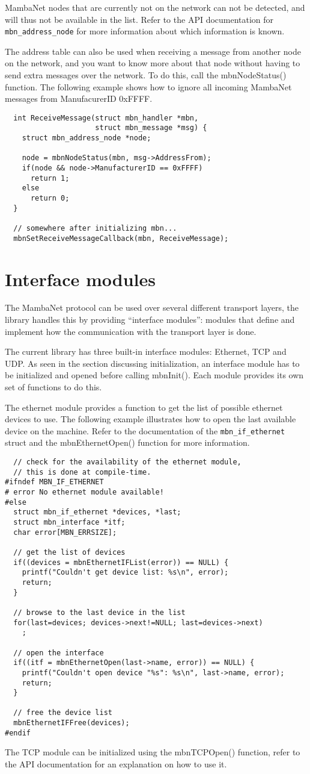 MambaNet nodes that are currently not on the network can not be detected, and will thus not be available in the list. Refer to the API documentation for \verb|mbn_address_node| for more information about which information is known.

The address table can also be used when receiving a message from another node on the network, and you want to know more about that node without having to send extra messages over the network. To do this, call the mbnNodeStatus() function. The following example shows how to ignore all incoming MambaNet messages from ManufacurerID 0xFFFF.
\begin{verbatim}
  int ReceiveMessage(struct mbn_handler *mbn,
                     struct mbn_message *msg) {
    struct mbn_address_node *node;

    node = mbnNodeStatus(mbn, msg->AddressFrom);
    if(node && node->ManufacturerID == 0xFFFF)
      return 1;
    else
      return 0;
  }

  // somewhere after initializing mbn...
  mbnSetReceiveMessageCallback(mbn, ReceiveMessage);
\end{verbatim}



\section{Interface modules}
The MambaNet protocol can be used over several different transport layers, the library handles this by providing ``interface modules'': modules that define and implement how the communication with the transport layer is done.

The current library has three built-in interface modules: Ethernet, TCP and UDP. As seen in the section discussing initialization, an interface module has to be initialized and opened before calling mbnInit(). Each module provides its own set of functions to do this.

The ethernet module provides a function to get the list of possible ethernet devices to use. The following example illustrates how to open the last available device on the machine. Refer to the documentation of the \verb|mbn_if_ethernet| struct and the mbnEthernetOpen() function for more information.
\begin{verbatim}
  // check for the availability of the ethernet module,
  // this is done at compile-time.
#ifndef MBN_IF_ETHERNET
# error No ethernet module available!
#else
  struct mbn_if_ethernet *devices, *last;
  struct mbn_interface *itf;
  char error[MBN_ERRSIZE];

  // get the list of devices
  if((devices = mbnEthernetIFList(error)) == NULL) {
    printf("Couldn't get device list: %s\n", error);
    return;
  }

  // browse to the last device in the list
  for(last=devices; devices->next!=NULL; last=devices->next)
    ;

  // open the interface
  if((itf = mbnEthernetOpen(last->name, error)) == NULL) {
    printf("Couldn't open device "%s": %s\n", last->name, error);
    return;
  }

  // free the device list
  mbnEthernetIFFree(devices);
#endif
\end{verbatim}

The TCP module can be initialized using the mbnTCPOpen() function, refer to the API documentation for an explanation on how to use it.



